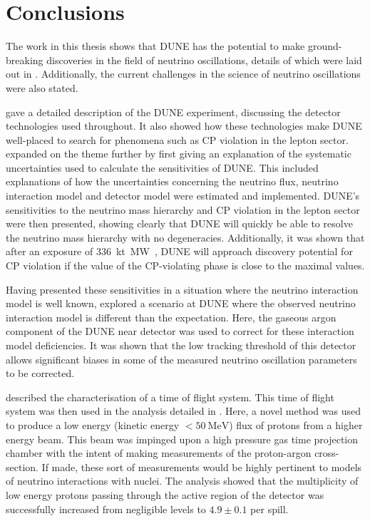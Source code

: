 \chapter{Conclusions}
\label{sec:conclusions}

The work in this thesis shows that DUNE has the potential to make ground-breaking discoveries in the field of neutrino oscillations, details of which were laid out in . 
Additionally, the current challenges in the science of neutrino oscillations were also stated.

 gave a detailed description of the DUNE experiment, discussing the detector technologies used throughout.
It also showed how these technologies make DUNE well-placed to search for phenomena such as CP violation in the lepton sector.
 expanded on the theme further by first giving an explanation of the systematic uncertainties used to calculate the sensitivities of DUNE. 
This included explanations of how the uncertainties concerning the neutrino flux, neutrino interaction model and detector model were estimated and implemented.
DUNE's sensitivities to the neutrino mass hierarchy and CP violation in the lepton sector were then presented, showing clearly that DUNE will quickly be able to resolve the neutrino mass hierarchy with no degeneracies.
Additionally, it was shown that after an exposure of \SI{336}{\kilo\tonne\mega\watt\year}, DUNE will approach discovery potential for CP violation if the value of the CP-violating phase is close to the maximal values.

Having presented these sensitivities in a situation where the neutrino interaction model is well known,  explored a scenario at DUNE where the observed neutrino interaction model is different than the expectation.
Here, the gaseous argon component of the DUNE near detector was used to correct for these interaction model deficiencies. 
It was shown that the low tracking threshold of this detector allows significant biases in some of the measured neutrino oscillation parameters to be corrected. 

 described the characterisation of a time of flight system.
This time of flight system was then used in the analysis detailed in .
Here, a novel method was used to produce a low energy (kinetic energy $<\SI{50}{\MeV}$) flux of protons from a higher energy beam.
This beam was impinged upon a high pressure gas time projection chamber with the intent of making measurements of the proton-argon cross-section.
If made, these sort of measurements would be highly pertinent to models of neutrino interactions with nuclei.
The analysis showed that the multiplicity of low energy protons passing through the active region of the detector was successfully increased from negligible levels to $4.9 \pm 0.1$ per spill.

